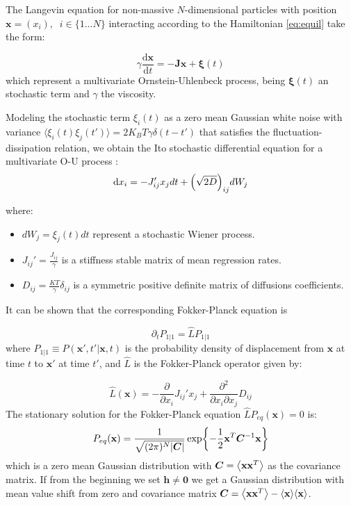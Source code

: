\documentclass[reprint,amsmath,amssymb,superscriptaddress,showpacs,pre]{revtex4-1}
\let\originalleft\left
\let\originalright\right
\renewcommand{\left}{\mathopen{}\mathclose\bgroup\originalleft}
\renewcommand{\right}{\aftergroup\egroup\originalright}
\newcommand{\ddroit}{\textrm{d}}
\begin{document}
The Langevin equation for  non-massive $N$-dimensional particles with position $\mathbf{x} = (x_i),\;\;i\in\{1\ldots N\}$   interacting according to the Hamiltonian \ref{eq:equil} take the form:

\begin{equation}
\gamma \frac{\ddroit \mathbf{x} }{\ddroit t} = - \bm J \mathbf{x}  + \mathbf{\xi}(t)
\end{equation}
which represent  a multivariate Ornstein-Uhlenbeck   process, being $ \mathbf{\xi}(t)$ an stochastic term and $\gamma$ the viscosity.

Modeling the stochastic term $\xi_i(t)$ as a zero mean Gaussian white noise with variance $\langle \xi_i(t)\xi_j(t') \rangle = 2 K_B T\gamma\delta(t-t')$ that satisfies the fluctuation-dissipation relation, we obtain  the Ito stochastic differential equation for a multivariate O-U process \cite{singh2017multiOU}:
\begin{equation}
\ddroit x_i = -J_{ij}'x_j dt + \left( \sqrt{2 D}\right) _{ij} dW_j
\end{equation}

where:
\begin{itemize}
	\item $dW_j=\xi_j(t) dt$ represent a stochastic Wiener process. 
	\item $J_{ij}'=\frac{J_{ij}}{\gamma}$ is a stiffness stable matrix of mean regression rates.
	\item $D_{ij}=\frac{KT}{\gamma}\delta_{ij}$ is a symmetric positive definite matrix of diffusions coefficients.  
\end{itemize}

It can be shown that the corresponding Fokker-Planck equation is


\begin{equation}
\partial_t P_{1|1}=\hat{L} P_{1|1} 
\end{equation}
where  $P_{1|1}\equiv P( \mathbf{x}', t'|\mathbf{x}, t)$ is the probability density of displacement from $ \mathbf{x}$ at time $t$ to $ \mathbf{x} '$ at time $t'$, and $\hat{L} $ is the  Fokker-Planck operator given by:

\begin{equation}
\hat{L}( \mathbf{x})=-\frac{\partial}{\partial x_i}J_{ij}' x_j+\frac{\partial^2}{\partial x_i\partial x_j}D_{ij}
\end{equation}
The stationary solution for the Fokker-Planck equation $\hat{L} P_{eq}( \mathbf{x})=0$ is:
\begin{equation}
P_{eq}( \mathbf{x}) = \frac{1}{\sqrt{(2\pi)^N \vert \bm{C}\vert}}\exp\left\{ -\frac{1}{2} \mathbf{x}^T\bm{C}^{-1} \mathbf{x} \right\}
\end{equation}
which is a zero mean Gaussian distribution with $\bm C=\left\langle  \mathbf{x}  \mathbf{x}^T\right\rangle $ as the covariance matrix. If from the beginning we set $\mathbf{h}\neq\mathbf{0}$ we get a Gaussian distribution with mean value shift from zero and covariance matrix $\bm C=\left\langle \mathbf{x} \mathbf{x}^T\right\rangle- \left\langle \mathbf{x} \right\rangle \left\langle \mathbf{x} \right\rangle$.
\end{document}
